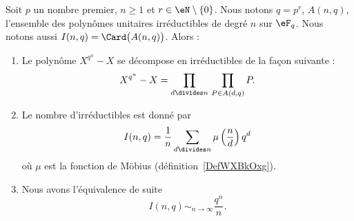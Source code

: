 \begin{proposition} \label{PropVFNOvzZ}
	Soit \( p\) un nombre premier, \( n\geq 1\) et \( r\in \eN\setminus\{ 0 \}\). Nous notons \( q=p^r\), \( A(n,q)\), l'ensemble des polynômes unitaires irréductibles de degré \( n\) sur \( \eF_q\). Nous notons aussi \( I(n,q)=\Card\big( A(n,q) \big)\). Alors :
	\begin{enumerate}
		\item
		      Le polynôme \( X^{q^n}-X\) se décompose en irréductibles de la façon suivante :
		      \begin{equation}
			      X^{q^n}-X=\prod_{d\divides n}\,\prod_{P\in A(d,q)}P.
		      \end{equation}
		\item
		      Le nombre d'irréductibles est donné par
		      \begin{equation}
			      I(n,q)=\frac{1}{ n }\sum_{d\divides n}\mu\left( \frac{ n }{ d } \right)q^d
		      \end{equation}
		      où \( \mu\) est la fonction de Möbius (définition~\ref{DefWXBkOxg}).
		\item
		      Nous avons l'équivalence de suite
		      \begin{equation}
			      I(n,q)\sim_{n\to\infty}\frac{ q^n }{ n }.
		      \end{equation}
	\end{enumerate}
\end{proposition}

